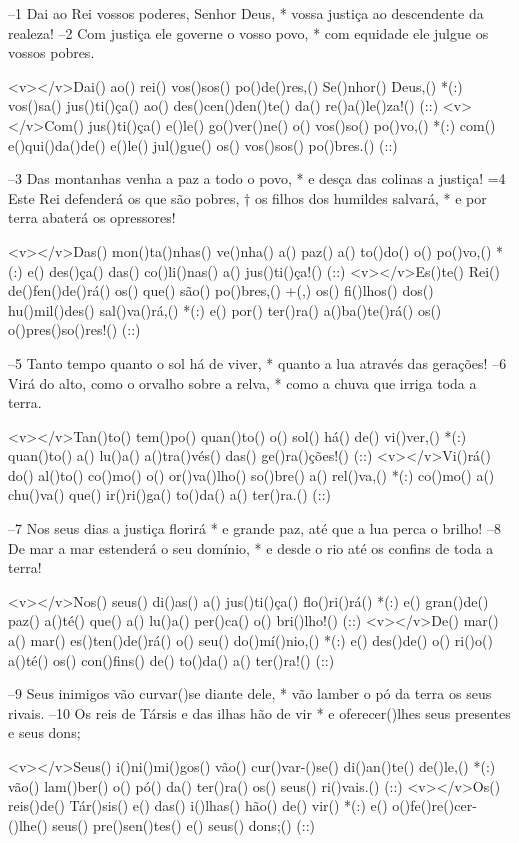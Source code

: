 –1 Dai ao Rei vossos poderes, Senhor Deus, *
vossa justiça ao descendente da realeza!
–2 Com justiça ele governe o vosso povo, *
com equidade ele julgue os vossos pobres.

<v></v>Dai() ao() rei() vos()sos() po()de()res,() Se()nhor() Deus,() *(:)
vos()sa() jus()ti()ça() ao() des()cen()den()te() da() re()a()le()za!() (::)
<v></v>Com() jus()ti()ça() e()le() go()ver()ne() o() vos()so() po()vo,() *(:)
com() e()qui()da()de() e()le() jul()gue() os() vos()sos() po()bres.() (::)

–3 Das montanhas venha a paz a todo o povo, *
e desça das colinas a justiça!
=4 Este Rei defenderá os que são pobres, †
os filhos dos humildes salvará, *
e por terra abaterá os opressores!

<v></v>Das() mon()ta()nhas() ve()nha() a() paz() a() to()do() o() po()vo,() *(:)
e() des()ça() das() co()li()nas() a() jus()ti()ça!() (::)
<v></v>Es()te() Rei() de()fen()de()rá() os() que() são() po()bres,() +(,)
os() fi()lhos() dos() hu()mil()des() sal()va()rá,() *(:)
e() por() ter()ra() a()ba()te()rá() os() o()pres()so()res!() (::)

–5 Tanto tempo quanto o sol há de viver, *
quanto a lua através das gerações!
–6 Virá do alto, como o orvalho sobre a relva, *
como a chuva que irriga toda a terra.

<v></v>Tan()to() tem()po() quan()to() o() sol() há() de() vi()ver,() *(:)
quan()to() a() lu()a() a()tra()vés() das() ge()ra()ções!() (::)
<v></v>Vi()rá() do() al()to() co()mo() o() or()va()lho() so()bre() a() rel()va,() *(:)
co()mo() a() chu()va() que() ir()ri()ga() to()da() a() ter()ra.() (::)

–7 Nos seus dias a justiça florirá *
e grande paz, até que a lua perca o brilho!
–8 De mar a mar estenderá o seu domínio, *
e desde o rio até os confins de toda a terra!

<v></v>Nos() seus() di()as() a() jus()ti()ça() flo()ri()rá() *(:)
e() gran()de() paz() a()té() que() a() lu()a() per()ca() o() bri()lho!() (::)
<v></v>De() mar() a() mar() es()ten()de()rá() o() seu() do()mí()nio,() *(:)
e() des()de() o() ri()o() a()té() os() con()fins() de() to()da() a() ter()ra!() (::)

–9 Seus inimigos vão curvar()se diante dele, *
vão lamber o pó da terra os seus rivais.
–10 Os reis de Társis e das ilhas hão de vir *
e oferecer()lhes seus presentes e seus dons;

<v></v>Seus() i()ni()mi()gos() vão() cur()var-()se() di()an()te() de()le,() *(:)
vão() lam()ber() o() pó() da() ter()ra() os() seus() ri()vais.() (::)
<v></v>Os() reis()de() Tár()sis() e() das() i()lhas() hão() de() vir() *(:)
e() o()fe()re()cer-()lhe() seus() pre()sen()tes() e() seus() dons;() (::)

